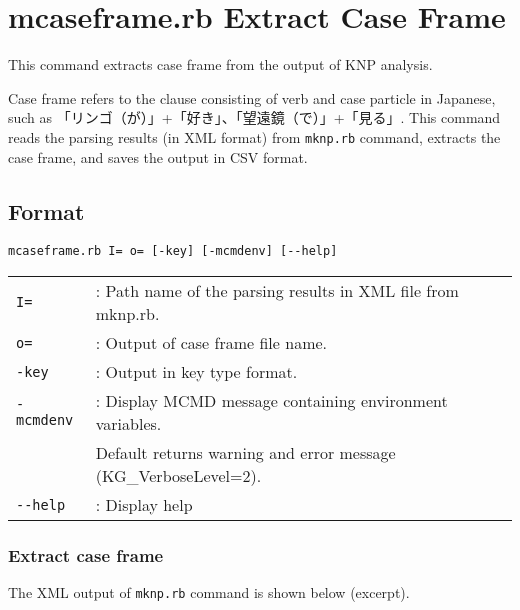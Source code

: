 



\section{mcaseframe.rb Extract Case Frame\label{sect:mcaseframe}}
 
This command extracts case frame from the output of KNP analysis.    

Case frame refers to the clause consisting of verb and case  particle in Japanese, such as 「リンゴ（が）」+「好き」、「望遠鏡（で）」+「見る」. 
This command reads the parsing results (in XML format) from \verb|mknp.rb| command, extracts the case frame,  and saves the output in CSV format.  


\subsection{Format}
\begin{verbatim}
mcaseframe.rb I= o= [-key] [-mcmdenv] [--help]
\end{verbatim}

\begin{table}[htbp]
{\small
\begin{tabular}{ll}
\verb|I=|        & : Path name of the parsing results in XML file from mknp.rb. \\
\verb|o=|        & : Output of case frame file name.  \\
\verb|-key|      & : Output in key type format.  \\
\verb|-mcmdenv|  & : Display MCMD message containing environment variables.  \\
                 &   Default returns warning and error message  (KG\_VerboseLevel=2). \\
\verb|--help|    & : Display help  \\
\end{tabular} 
}
\end{table} 

\subsubsection{Extract case frame }

The XML output of \verb|mknp.rb| command is shown below (excerpt).
 
